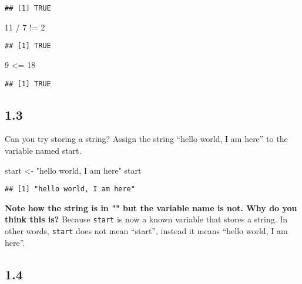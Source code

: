 \documentclass[
]{book}
\newenvironment{Shaded}{\begin{snugshade}}{\end{snugshade}}
\newcommand{\DecValTok}[1]{\textcolor[rgb]{0.00,0.00,0.81}{#1}}
\newcommand{\NormalTok}[1]{#1}
\newcommand{\OtherTok}[1]{\textcolor[rgb]{0.56,0.35,0.01}{#1}}
\newcommand{\SpecialCharTok}[1]{\textcolor[rgb]{0.00,0.00,0.00}{#1}}
\newcommand{\StringTok}[1]{\textcolor[rgb]{0.31,0.60,0.02}{#1}}
\begin{document}
\begin{verbatim}
## [1] TRUE
\end{verbatim}

\begin{Shaded}
\begin{Highlighting}[]
\DecValTok{11} \SpecialCharTok{/} \DecValTok{7} \SpecialCharTok{!=} \DecValTok{2}
\end{Highlighting}
\end{Shaded}

\begin{verbatim}
## [1] TRUE
\end{verbatim}

\begin{Shaded}
\begin{Highlighting}[]
\DecValTok{9} \SpecialCharTok{\textless{}=} \DecValTok{18}
\end{Highlighting}
\end{Shaded}

\begin{verbatim}
## [1] TRUE
\end{verbatim}

\hypertarget{section-2}{%
\subsection{1.3}\label{section-2}}

Can you try storing a string? Assign the string ``hello world, I am here'' to the variable named start.

\begin{Shaded}
\begin{Highlighting}[]
\NormalTok{start }\OtherTok{\textless{}{-}} \StringTok{"hello world, I am here"}
\NormalTok{start}
\end{Highlighting}
\end{Shaded}

\begin{verbatim}
## [1] "hello world, I am here"
\end{verbatim}

\textbf{Note how the string is in "" but the variable name is not. Why do you think this is?}
Because \texttt{start} is now a known variable that stores a string. In other words, \texttt{start} does not mean ``start'', instead it means ``hello world, I am here''.

\hypertarget{section-3}{%
\subsection{1.4}\label{section-3}}
\end{document}
